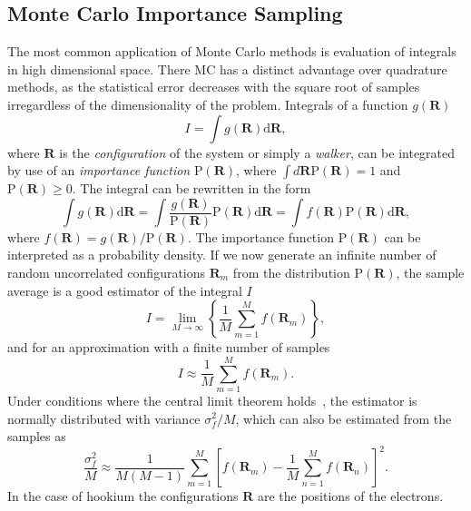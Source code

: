 \documentclass[final,3p,times,twocolumn]{elsarticle}
\begin{document}
	\subsection{Monte Carlo Importance Sampling}
	\label{subsec:Impl-MCIP}
	The most common application of Monte Carlo methods is evaluation of integrals in high dimensional space. There MC has a distinct advantage over quadrature methods, as the statistical error decreases with the square root of samples irregardless of the dimensionality of the problem. Integrals of a function $g(\mathbf{R})$
	\begin{equation}
		I=\int g(\mathbf{R}) \mathrm{d} \mathbf{R},
	\end{equation}
	where $\mathbf{R}$ is the \emph{configuration} of the system or simply a \emph{walker}, can be integrated by use of an \emph{importance function} $\mathrm{P}(\mathbf{R})$, where $\int d \mathbf{R} \text{P}(\mathbf{R})=1$ and $\mathrm{P} (\mathbf{R}) \geq 0$. The integral can be rewritten in the form
	\begin{equation}
		\int g(\mathbf{R}) \mathrm{d} \mathbf{R} = \int \frac{g(\mathbf{R})}{\mathrm{P}(\mathbf{R})} \mathrm{P}(\mathbf{R}) \mathrm{d} \mathbf{R} = \int f(\mathbf{R})\mathrm{P}(\mathbf{R}) \mathrm{d} \mathbf{R},
	\end{equation}
	where $f(\mathbf{R}) = g(\mathbf{R}) / \mathrm{P}(\mathbf{R})$.
	The importance function $\mathrm{P}(\mathbf{R})$ can be interpreted as a probability density. If we now generate an infinite number of random uncorrelated configurations $\mathbf{R}_m$ from the distribution $\mathrm{P}(\mathbf{R})$, the sample average is a good estimator of the integral $I$
	\begin{equation}
		I=\lim _{M \rightarrow \infty}\left\{\frac{1}{M} \sum_{m=1}^{M} f\left(\mathbf{R}_{m}\right)\right\},
	\end{equation}
	and for an approximation with a finite number of samples
	\begin{equation}
		I \approx \frac{1}{M} \sum_{m=1}^{M} f\left(\mathbf{R}_{m}\right).
	\end{equation}
	Under conditions where the central limit theorem holds~\cite{foulkes2001quantum}, the estimator is normally distributed with variance $\sigma_{f}^{2}/M$, which can also be estimated from the samples as
	\begin{equation}
		\frac{\sigma_{f}^{2}}{M} \approx \frac{1}{M(M-1)} \sum_{m=1}^{M}\left[f\left(\mathbf{R}_{m}\right)-\frac{1}{M} \sum_{n=1}^{M} f\left(\mathbf{R}_{n}\right)\right]^{2}.
	\end{equation}
	In the case of hookium the configurations $\mathbf{R}$ are the positions of the electrons.
	
\end{document}

